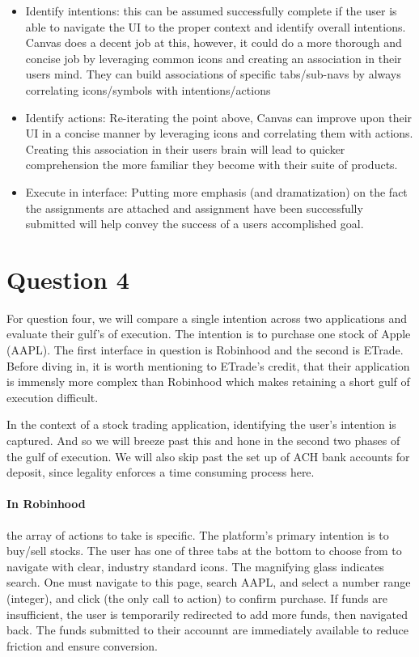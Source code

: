 \begin{itemize}
\item
Identify intentions: this can be assumed successfully complete if the user is able to navigate the UI to the proper context and identify overall intentions. Canvas does a decent job at this, however, it could do a more thorough and concise job by leveraging common icons and creating an association in their users mind. They can build associations of specific tabs/sub-navs by always correlating icons/symbols with intentions/actions
\item
Identify actions: Re-iterating the point above, Canvas can improve upon their UI in a concise manner by leveraging icons and correlating them with actions. Creating this association in their users brain will lead to quicker comprehension the more familiar they become with their suite of products.
\item
Execute in interface: Putting more emphasis (and dramatization) on the fact the assignments are attached and assignment have been successfully submitted will help convey the success of a users accomplished goal.
\end{itemize}

\section{Question 4}

For question four, we will compare a single intention across two applications and evaluate their gulf's of execution. The intention is to purchase one stock of Apple (AAPL). The first interface in question is Robinhood and the second is ETrade. Before diving in, it is worth mentioning to ETrade's credit, that their application is immensly more complex than Robinhood which makes retaining a short gulf of execution difficult.

In the context of a stock trading application, identifying the user's intention is captured. And so we will breeze past this and hone in the second two phases of the gulf of execution. We will also skip past the set up of ACH bank accounts for deposit, since legality enforces a time consuming process here.

\paragraph{In Robinhood}
the array of actions to take is specific. The platform's primary intention is to buy/sell stocks. The user has one of three tabs at the bottom to choose from to navigate with clear, industry standard icons. The magnifying glass indicates search. One must navigate to this page, search AAPL, and select a number range (integer), and click (the only call to action) to confirm purchase. If funds are insufficient, the user is temporarily redirected to add more funds, then navigated back. The funds submitted to their accounnt are immediately available to reduce friction and ensure conversion.

